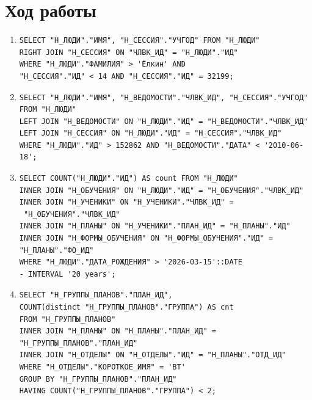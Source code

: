 \section{Ход работы}
\begin{enumerate}

\item
\begin{verbatim} 
SELECT "Н_ЛЮДИ"."ИМЯ", "Н_СЕССИЯ"."УЧГОД" FROM "Н_ЛЮДИ"
RIGHT JOIN "Н_СЕССИЯ" ON "ЧЛВК_ИД" = "Н_ЛЮДИ"."ИД" 
WHERE "Н_ЛЮДИ"."ФАМИЛИЯ" > 'Ёлкин' AND  
"Н_СЕССИЯ"."ИД" < 14 AND "Н_СЕССИЯ"."ИД" = 32199;
\end{verbatim}

\item
\begin{verbatim} 
SELECT "Н_ЛЮДИ"."ИМЯ", "Н_ВЕДОМОСТИ"."ЧЛВК_ИД", "Н_СЕССИЯ"."УЧГОД" 
FROM "Н_ЛЮДИ" 
LEFT JOIN "Н_ВЕДОМОСТИ" ON "Н_ЛЮДИ"."ИД" = "Н_ВЕДОМОСТИ"."ЧЛВК_ИД" 
LEFT JOIN "Н_СЕССИЯ" ON "Н_ЛЮДИ"."ИД" = "Н_СЕССИЯ"."ЧЛВК_ИД" 
WHERE "Н_ЛЮДИ"."ИД" > 152862 AND "Н_ВЕДОМОСТИ"."ДАТА" < '2010-06-18';
\end{verbatim}

\item 
\begin{verbatim} 
SELECT COUNT("Н_ЛЮДИ"."ИД") AS count FROM "Н_ЛЮДИ"
INNER JOIN "Н_ОБУЧЕНИЯ" ON "Н_ЛЮДИ"."ИД" = "Н_ОБУЧЕНИЯ"."ЧЛВК_ИД"
INNER JOIN "Н_УЧЕНИКИ" ON "Н_УЧЕНИКИ"."ЧЛВК_ИД" =
 "Н_ОБУЧЕНИЯ"."ЧЛВК_ИД"
INNER JOIN "Н_ПЛАНЫ" ON "Н_УЧЕНИКИ"."ПЛАН_ИД" = "Н_ПЛАНЫ"."ИД" 
INNER JOIN "Н_ФОРМЫ_ОБУЧЕНИЯ" ON "Н_ФОРМЫ_ОБУЧЕНИЯ"."ИД" = 
"Н_ПЛАНЫ"."ФО_ИД" 
WHERE "Н_ЛЮДИ"."ДАТА_РОЖДЕНИЯ" > '2026-03-15'::DATE 
- INTERVAL '20 years';
\end{verbatim}

\item 
\begin{verbatim} 
SELECT "Н_ГРУППЫ_ПЛАНОВ"."ПЛАН_ИД", 
COUNT(distinct "Н_ГРУППЫ_ПЛАНОВ"."ГРУППА") AS cnt 
FROM "Н_ГРУППЫ_ПЛАНОВ" 
INNER JOIN "Н_ПЛАНЫ" ON "Н_ПЛАНЫ"."ПЛАН_ИД" = 
"Н_ГРУППЫ_ПЛАНОВ"."ПЛАН_ИД" 
INNER JOIN "Н_ОТДЕЛЫ" ON "Н_ОТДЕЛЫ"."ИД" = "Н_ПЛАНЫ"."ОТД_ИД" 
WHERE "Н_ОТДЕЛЫ"."КОРОТКОЕ_ИМЯ" = 'ВТ' 
GROUP BY "Н_ГРУППЫ_ПЛАНОВ"."ПЛАН_ИД" 
HAVING COUNT("Н_ГРУППЫ_ПЛАНОВ"."ГРУППА") < 2;
\end{verbatim}


\end{enumerate}
